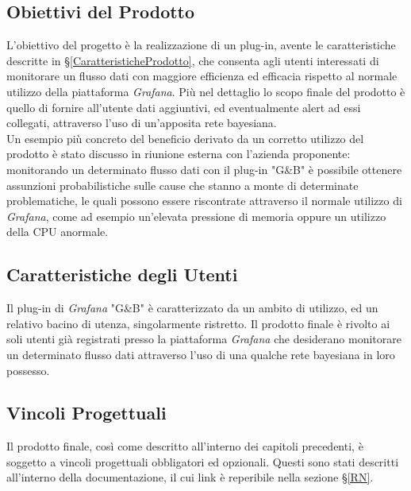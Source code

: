\subsection{Obiettivi del Prodotto}\label{ObiettiviProdotto}
L'obiettivo del progetto è la realizzazione di un plug-in, avente le caratteristiche descritte in §\ref{CaratteristicheProdotto}, che consenta agli utenti interessati di monitorare un flusso dati con maggiore efficienza ed efficacia rispetto al normale utilizzo della piattaforma \textit{Grafana}. Più nel dettaglio lo scopo finale del prodotto è quello di fornire all'utente dati aggiuntivi, ed eventualmente alert ad essi collegati, attraverso l'uso di un'apposita rete bayesiana.\\
Un esempio più concreto del beneficio derivato da un corretto utilizzo del prodotto è stato discusso in riunione esterna con l'azienda proponente: monitorando un determinato flusso dati con il plug-in "G\&B" è possibile ottenere assunzioni probabilistiche sulle cause che stanno a monte di determinate problematiche, le quali possono essere riscontrate attraverso il normale utilizzo di \textit{Grafana}, come ad esempio un'elevata pressione di memoria oppure un utilizzo della CPU anormale.

\subsection{Caratteristiche degli Utenti}\label{CaratteristicheUtenti}
Il plug-in di \textit{Grafana} "G\&B" è caratterizzato da un ambito di utilizzo, ed un relativo bacino di utenza, singolarmente ristretto. Il prodotto finale è rivolto ai soli utenti già registrati presso la piattaforma \textit{Grafana} che desiderano monitorare un determinato flusso dati attraverso l'uso di una qualche rete bayesiana in loro possesso.

\subsection{Vincoli Progettuali}
\label{VincoliProgettuali}

Il prodotto finale, così come descritto all'interno dei capitoli precedenti, è soggetto a vincoli progettuali obbligatori ed opzionali. Questi sono stati descritti all'interno della documentazione, il cui link è reperibile nella sezione §\ref{RN}. \\

